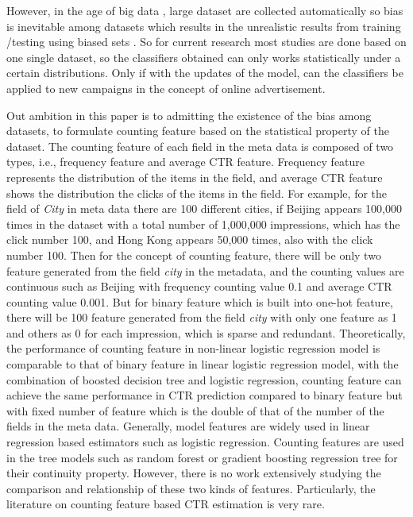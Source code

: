 However, in the age of big data \cite{lohr2012age}, large dataset are collected automatically so bias is inevitable among datasets which results in the unrealistic results from training /testing using biased sets \cite{torralba2011unbiased}. So for current research most studies are done based on one single dataset, so the classifiers obtained can only works statistically under a certain distributions. Only if with the updates of the model, can the classifiers be applied to new campaigns in the concept of online advertisement. 

Out ambition in this paper is to admitting the existence of the bias among datasets, to formulate counting feature based on the statistical property of the dataset. The counting feature of each field in the meta data is composed of two types, i.e., frequency feature and average CTR feature. Frequency feature represents the distribution of the items in the field, and average CTR feature shows the distribution the clicks of the items in the field. For example, for the field of \textit{City} in meta data there are 100 different cities, if Beijing appears 100,000 times in the dataset with a total number of 1,000,000 impressions, which has the click number 100, and Hong Kong appears 50,000 times, also with the click number 100. Then for the concept of counting feature, there will be only two feature generated from the field \textit{city} in the metadata, and the counting values are continuous such as Beijing with frequency counting value 0.1 and average CTR counting value 0.001. But for binary feature which is built into one-hot feature, there will be 100 feature generated from the field \textit{city} with only one feature as 1 and others as 0 for each impression, which is sparse and redundant. Theoretically, the performance of counting feature in non-linear logistic regression model is comparable to that of binary feature in linear logistic regression model, with the combination of boosted decision tree and logistic regression, counting feature can achieve the same performance in CTR prediction compared to binary feature but with fixed number of feature which is the double of that of the number of the fields in the meta data. Generally, model features are widely used in linear regression based estimators such as logistic regression. Counting features are used in the tree models such as random forest or gradient boosting regression tree for their continuity property. However, there is no work extensively studying the comparison and relationship of these two kinds of features. Particularly, the literature on counting feature based CTR estimation is very rare.


